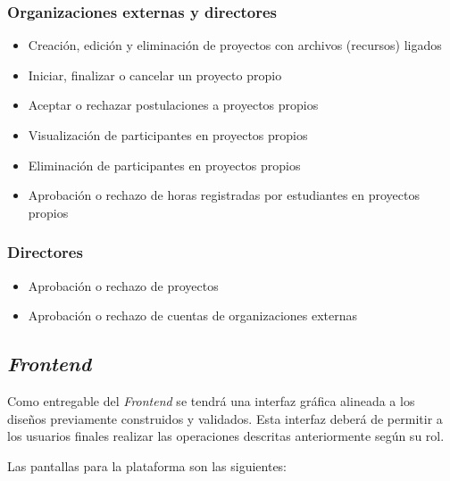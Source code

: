 \subsubsection{Organizaciones externas y directores}
\begin{itemize}
    \item Creación, edición y eliminación de proyectos con archivos (recursos) ligados
    \item Iniciar, finalizar o cancelar un proyecto propio
    \item Aceptar o rechazar postulaciones a proyectos propios
    \item Visualización de participantes en proyectos propios
    \item Eliminación de participantes en proyectos propios
    \item Aprobación o rechazo de horas registradas por estudiantes en proyectos propios
\end{itemize}

\subsubsection{Directores}
\begin{itemize}
    \item Aprobación o rechazo de proyectos
    \item Aprobación o rechazo de cuentas de organizaciones externas
\end{itemize}

\subsection{\textit{Frontend}}
Como entregable del \textit{Frontend} se tendrá una interfaz gráfica alineada a los diseños
previamente construidos y validados. Esta interfaz deberá de permitir a los usuarios finales
realizar las operaciones descritas anteriormente según su rol.

Las pantallas para la plataforma son las siguientes:

